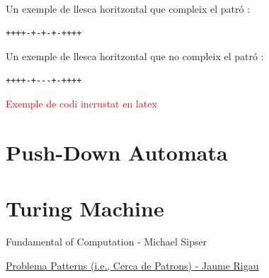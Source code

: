 \documentclass[12pt,a4paper]{report}
\begin{document}
Un exemple de llesca horitzontal que compleix el patró : 

\begin{lstlisting}[columns=fullflexible]
++++-+-+-+-++++ 
\end{lstlisting}

Un exemple de llesca horitzontal que no compleix el patró : 

\begin{lstlisting}[columns=fullflexible]
++++-+---+-++++ 
\end{lstlisting}

\clearpage

\textcolor{red}{Exemple de codi incrustat en latex}




\chapter{Push-Down Automata}

\chapter{Turing Machine}

\begin{thebibliography}{9}
Fundamental of Computation - Michael Sipser
 
\hyperlink{http://ima.udg.edu/~rigau/FC/FC_patterns.pdf}{Problema Patterns (i.e., Cerca de Patrons) - Jaume Rigau} 

\end{thebibliography}

\printindex
\end{document}
